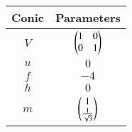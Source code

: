 \begin{tabular}[12pt]{ |c| c|}
    \hline
    \textbf{Conic}& \textbf{Parameters}\\ 
    \hline
     $V$& $\begin{pmatrix}1 & 0 \\ 0 & 1\end{pmatrix}$\\
    \hline 
     $u$& $0$\\
    \hline
     $f$& $-4$\\
     \hline
     $h$& $0$\\
     \hline
     $m$& $\begin{pmatrix}1\\\frac{1}{\sqrt{3}}\end{pmatrix}$\\
     \hline
    \end{tabular}
